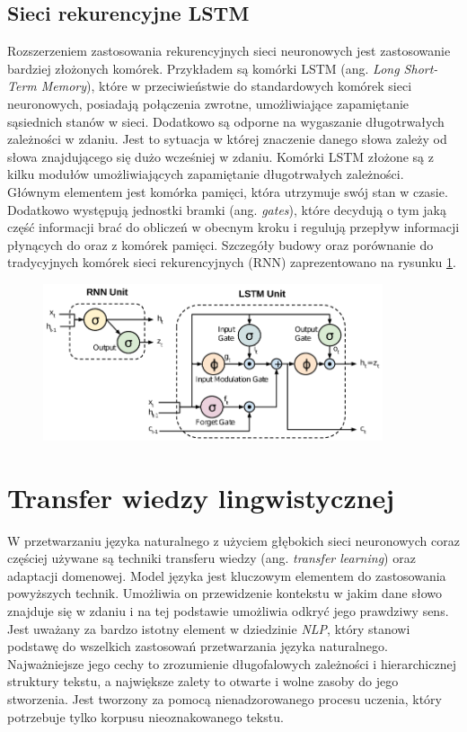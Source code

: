 \subsection{Sieci rekurencyjne LSTM}

Rozszerzeniem zastosowania rekurencyjnych sieci neuronowych jest zastosowanie bardziej złożonych komórek. Przykładem są komórki LSTM (ang. \textit{Long Short-Term Memory}), które w przeciwieństwie do standardowych komórek sieci neuronowych, posiadają połączenia zwrotne, umożliwiające zapamiętanie sąsiednich stanów w sieci. Dodatkowo są odporne na wygaszanie długotrwałych zależności w zdaniu. Jest to sytuacja w której znaczenie danego słowa zależy od słowa znajdującego się dużo wcześniej w zdaniu. Komórki LSTM złożone są z kilku modułów umożliwiających zapamiętanie długotrwałych zależności. Głównym elementem jest komórka pamięci, która utrzymuje swój stan w czasie. Dodatkowo występują jednostki bramki (ang. \textit{gates}), które decydują o tym jaką część informacji brać do obliczeń w obecnym kroku i regulują przepływ informacji płynących do oraz z komórek pamięci. Szczegóły budowy oraz porównanie do tradycyjnych komórek sieci rekurencyjnych (RNN) zaprezentowano na rysunku \ref{rys:rnn_vs_lstm}.

\begin{figure}[t]
\centering\includegraphics[width=10cm]{figures/rnn_vs_lstm.png}
\label{rys:rnn_vs_lstm}
\end{figure}

\section{Transfer wiedzy lingwistycznej}

W przetwarzaniu języka naturalnego z użyciem głębokich sieci neuronowych coraz częściej używane są techniki transferu wiedzy (ang. \textit{transfer learning}) oraz adaptacji domenowej. Model języka jest kluczowym elementem do zastosowania powyższych technik. Umożliwia on przewidzenie kontekstu w jakim dane słowo znajduje się w zdaniu i na tej podstawie umożliwia odkryć jego prawdziwy sens. Jest uważany za bardzo istotny element w dziedzinie \textit{NLP}, który stanowi podstawę do wszelkich zastosowań przetwarzania języka naturalnego. Najważniejsze jego cechy to zrozumienie długofalowych zależności i hierarchicznej struktury tekstu, a największe zalety to otwarte i wolne zasoby do jego stworzenia. Jest tworzony za pomocą nienadzorowanego procesu uczenia, który potrzebuje tylko korpusu nieoznakowanego tekstu.

